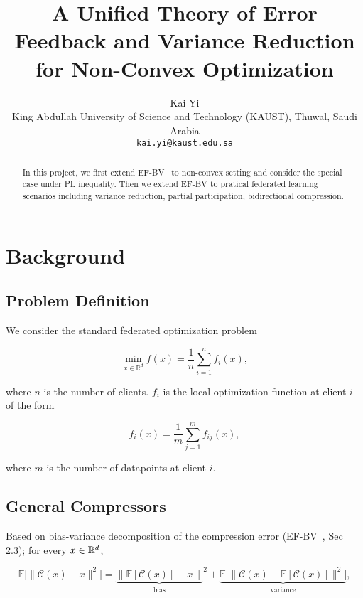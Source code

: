 \documentclass{article} %
\title{A Unified Theory of Error Feedback and Variance Reduction for Non-Convex Optimization}
\author{Kai Yi\\
   King Abdullah University of Science and Technology (KAUST), Thuwal, Saudi Arabia\\
   \texttt{kai.yi@kaust.edu.sa}
}
\newcommand{\algname}[1]{{\sf\green\relscale{0.90}#1}\xspace}
\theoremstyle{plain}
\theoremstyle{definition}
\theoremstyle{remark}
\newcommand{\green}{\color{mydarkgreen}}
\begin{document}
\maketitle


\begin{abstract}  
In this project, we first extend EF-BV~\cite{condat2022ef} to non-convex setting and consider the special case under PL inequality. Then we extend EF-BV to pratical federated learning scenarios including variance reduction, partial participation, bidirectional compression.  
\end{abstract}

\tableofcontents
\newpage

\section{Background}
\subsection{Problem Definition}
We consider the standard federated optimization problem

\begin{equation}
   \min_{x\in\mathbb{R}^d} f(x) = \frac{1}{n}\sum_{i=1}^n f_i (x),
\end{equation}

where $n$ is the number of clients. $f_i$ is the local optimization function at client $i$ of the form 

\begin{equation}
   f_i(x) = \frac{1}{m} \sum_{j=1}^m f_{ij} (x),
\end{equation}

where $m$ is the number of datapoints at client $i$. 

\subsection{General Compressors}
Based on bias-variance decomposition of the compression error (\algname{EF-BV}~\cite{condat2022ef}, Sec 2.3); for every $x\in \mathbb{R}^d$,

\begin{equation}
   \mathbb{E}\big[\|\mathcal{C}(x)-x\|^2\big] = {\underbrace{\big\| \mathbb{E}[\mathcal{C}(x)]-x\big\|}_{\text{bias}}}^2 + \underbrace{\mathbb{E}\Big[\big\|\mathcal{C}(x)-\mathbb{E}[\mathcal{C}(x)]\big\|^2\Big]}_{\text{variance}},\label{eqbiva}
   \end{equation}
\end{document}
